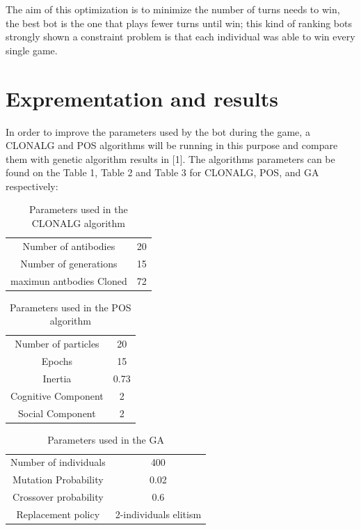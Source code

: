 \documentclass[]{interact}
\theoremstyle{plain}%
\theoremstyle{definition}
\theoremstyle{remark}
\begin{document}
The aim of this optimization is to minimize the number of turns needs to win, the best bot is the one that plays fewer turns until win; this kind of ranking bots strongly shown a constraint problem is that each individual was able to win every single game.

\section{Exprementation and results}
In order to improve the parameters used by the bot during the game, a CLONALG and POS algorithms will be running in this purpose and compare them with genetic algorithm results in [1]. The algorithms parameters can be found on the Table 1, Table 2 and Table 3 for CLONALG, POS, and GA respectively:
\begin{table}[h!]
\centering
\begin{tabular}{ |c|c| }
\hline
 Number of antibodies & 20 \\ 
 Number of generations & 15 \\  
 maximun antbodies Cloned & 72 \\ 
 \hline   
\end{tabular}
\centering
\caption{Parameters used in the CLONALG algorithm}
\label{TABLE 1}
\end{table}

\begin{table}[h!]
\centering
\begin{tabular}{ |c|c| }
\hline
 Number of particles & 20 \\ 
 Epochs & 15 \\  
 Inertia & 0.73 \\
 Cognitive Component & 2 \\
 Social Component & 2 \\ 
 \hline   
\end{tabular}
\caption{Parameters used in the POS algorithm}
\label{TABLE 2}
\end{table}

\begin{table}[h!]
\centering
\begin{tabular}{ |c|c| }
\hline
 Number of individuals & 400 \\ 
 Mutation Probability & 0.02 \\  
 Crossover probability & 0.6 \\
 Replacement policy & 2-individuals elitism \\
 \hline   
\end{tabular}
\caption{Parameters used in the GA}
\label{TABLE 3}
\end{table}
\end{document}
